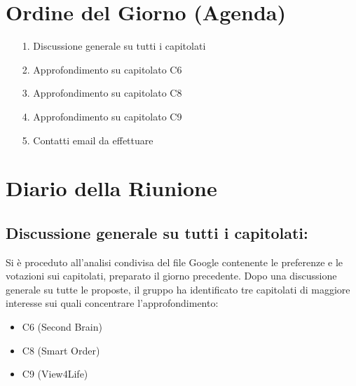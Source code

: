 \newpage
\section{Ordine del Giorno (Agenda)}
\begin{itemize}
    \item[1.] Discussione generale su tutti i capitolati
    \item[2.] Approfondimento su capitolato C6
    \item[3.] Approfondimento su capitolato C8
    \item[4.] Approfondimento su capitolato C9
    \item[5.] Contatti email da effettuare
\end{itemize}

\newpage
\section{Diario della Riunione}

\subsection{Discussione generale su tutti i capitolati:}

Si è proceduto all'analisi condivisa del file Google contenente le preferenze e le votazioni sui capitolati, preparato il giorno precedente. Dopo una discussione generale su tutte le proposte, il gruppo ha identificato tre capitolati di maggiore interesse sui quali concentrare l'approfondimento:
\begin{itemize}
    \item C6 (Second Brain)
    \item C8 (Smart Order)
    \item C9 (View4Life)
\end{itemize}


